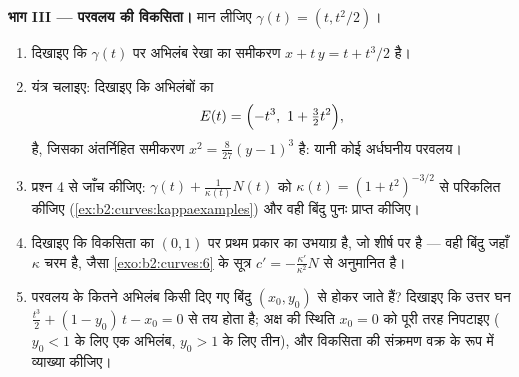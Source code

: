 \begin{problem}[{सप्ताहांत समस्या --- अन्वालोप यंत्र और
चार शास्त्रीय वक्र}]
\medskip
\noindent\textbf{भाग III --- परवलय की विकसिता।}
मान लीजिए $\gamma(t) = (t, t^2/2)$।
\begin{enumerate}[resume]
  \item दिखाइए कि $\gamma(t)$ पर अभिलंब रेखा का समीकरण
        $x + t\,y = t + t^3/2$ है।
  \item {} यंत्र चलाइए: दिखाइए कि अभिलंबों का 
        \[
        E(t) = \Bigl(-t^3,\ 1 + \tfrac32 t^2\Bigr),
        \]
        है, जिसका अंतर्निहित समीकरण $x^2 = \tfrac8{27}(y - 1)^3$ है:
        यानी कोई अर्धघनीय परवलय।
  \item प्रश्न 4 से जाँच कीजिए:  $\gamma(t) + \frac1{\kappa(t)}N(t)$ को
        $\kappa(t) = (1 + t^2)^{-3/2}$
        से परिकलित कीजिए (\cref{ex:b2:curves:kappaexamples}) और वही बिंदु
        पुनः प्राप्त कीजिए।
  \item दिखाइए कि विकसिता का $(0, 1)$ पर प्रथम प्रकार का उभयाग्र
        है, जो शीर्ष पर  है --- वही बिंदु जहाँ
        $\kappa$ चरम है, जैसा \cref{exo:b2:curves:6} के सूत्र $c' = -\frac{\kappa'}{\kappa^2}N$ से
        अनुमानित है।
  \item परवलय के कितने अभिलंब किसी दिए गए बिंदु $(x_0, y_0)$ से
        होकर जाते हैं? दिखाइए कि उत्तर घन $\tfrac{t^3}2 + (1 - y_0)\,t - x_0 = 0$ से तय
        होता है; अक्ष की स्थिति $x_0 = 0$ को पूरी तरह निपटाइए
        ($y_0 < 1$ के लिए एक अभिलंब, $y_0 > 1$ के लिए तीन), और
        विकसिता की संक्रमण वक्र के रूप में व्याख्या कीजिए।
\end{enumerate}


\end{problem}
